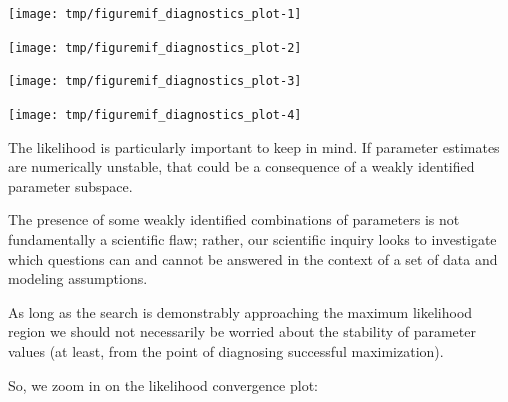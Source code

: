 \begin{frame}[fragile]

\begin{knitrout}\small
{}\color{fgcolor}\begin{kframe}
\begin{alltt}
\hlstd{(m3[r3}\hlopt{$}\hlopt{>}\hlopt{$}\hlopt{-}\hlstd{])}
\end{alltt}
\end{kframe}
\end{knitrout}

\vspace{-5mm}

\begin{knitrout}\small
{}\color{fgcolor}

{\centering \texttt{[image: tmp/figuremif\_diagnostics\_plot-1]} 

}




{\centering \texttt{[image: tmp/figuremif\_diagnostics\_plot-2]} 

}




{\centering \texttt{[image: tmp/figuremif\_diagnostics\_plot-3]} 

}




{\centering \texttt{[image: tmp/figuremif\_diagnostics\_plot-4]} 

}



\end{knitrout}

\end{frame}

\begin{frame}[fragile]

\bi
\item
The likelihood is particularly important to keep in mind. If parameter estimates are numerically unstable, that could be a consequence of a weakly identified parameter subspace.
\item
The presence of some weakly identified combinations of parameters is not fundamentally a scientific flaw; rather, our scientific inquiry looks to investigate which questions can and cannot be answered in the context of a set of data and modeling assumptions.
\item As long as the search is demonstrably approaching the maximum likelihood region we should not necessarily be worried about the stability of parameter values (at least, from the point of diagnosing successful maximization).
\item
So, we zoom in on the likelihood convergence plot:
\ei

\end{frame}

